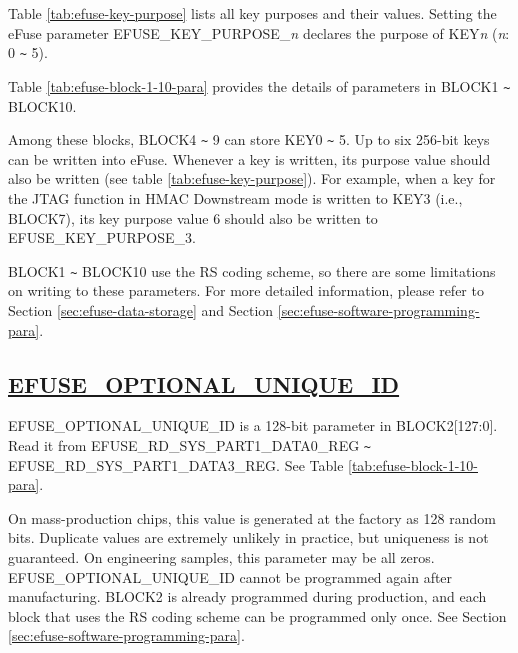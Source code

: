 \documentclass[main\_\_EN.tex]{subfiles}
\begin{document}
\clearpage
\begin{landscape}



\end{landscape}
\restoregeometry
\clearpage

Table \ref{tab:efuse-key-purpose} lists all key purposes and their values. Setting the eFuse parameter EFUSE\_KEY\_PURPOSE\_\textcolor{myred}{\it{n}} declares the purpose of KEY\textcolor{myred}{\it{n}} (\textcolor{myred}{\it{n}}: 0 \verb+~+ 5).



Table \ref{tab:efuse-block-1-10-para} provides the details of parameters in BLOCK1 \verb+~+ BLOCK10.

\clearpage
\begin{landscape}



\end{landscape}
\restoregeometry
\clearpage

Among these blocks, BLOCK4 \verb+~+ 9 can store KEY0 \verb+~+ 5. Up to six 256-bit keys can be written into eFuse. Whenever a key is written, its purpose value should also be written (see table \ref{tab:efuse-key-purpose}). For example, when a key for the JTAG function in HMAC Downstream mode is written to KEY\textcolor{myred}{3} (i.e., BLOCK7), its key purpose value 6 should also be written to EFUSE\_KEY\_PURPOSE\_\textcolor{myred}{3}.

BLOCK1 \verb+~+ BLOCK10 use the RS coding scheme, so there are some limitations on writing to these parameters. For more detailed information, please refer to Section \ref{sec:efuse-data-storage} and Section \ref{sec:efuse-software-programming-para}.

\subsection{\texorpdfstring{\hyperref[fielddesc:EFUSEOPTIONALUNIQUEID]{EFUSE\_OPTIONAL\_UNIQUE\_ID}}{EFUSE\_OPTIONAL\_UNIQUE\_ID}}
\label{sec:efuse-optional-unique-id}

EFUSE\_OPTIONAL\_UNIQUE\_ID is a 128-bit parameter in BLOCK2[127:0]. Read it from EFUSE\_RD\_SYS\_PART1\_DATA0\_REG \verb+~+ EFUSE\_RD\_SYS\_PART1\_DATA3\_REG. See Table \ref{tab:efuse-block-1-10-para}.

On mass-production chips, this value is generated at the factory as 128 random bits. Duplicate values are extremely unlikely in practice, but uniqueness is not guaranteed. On engineering samples, this parameter may be all zeros. EFUSE\_OPTIONAL\_UNIQUE\_ID cannot be programmed again after manufacturing. BLOCK2 is already programmed during production, and each block that uses the RS coding scheme can be programmed only once. See Section \ref{sec:efuse-software-programming-para}.
\end{document}
